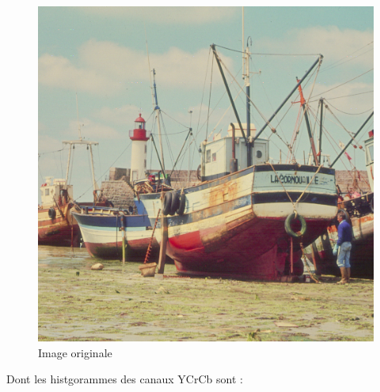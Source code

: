 \documentclass[12pt]{report}
\begin{document}
\begin{figure}[H]
\begin{center}
\includegraphics[scale=0.5]{../boats.jpg} 
\caption{Image originale}
\end{center}
\end{figure}

Dont les histgorammes des canaux YCrCb sont :
\end{document}
